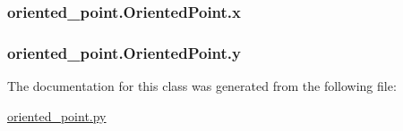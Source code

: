 \hypertarget{classoriented__point_1_1OrientedPoint_a020fc32ac0c377591b1d7686c66310ac}{
\subsubsection[{x}]{\setlength{\rightskip}{0pt plus 5cm}oriented\-\_\-point.\-Oriented\-Point.\-x}}\label{classoriented__point_1_1OrientedPoint_a020fc32ac0c377591b1d7686c66310ac}
\hypertarget{classoriented__point_1_1OrientedPoint_a9f9f32b6143828eefe2c768680b9ac44}{
\subsubsection[{y}]{\setlength{\rightskip}{0pt plus 5cm}oriented\-\_\-point.\-Oriented\-Point.\-y}}\label{classoriented__point_1_1OrientedPoint_a9f9f32b6143828eefe2c768680b9ac44}


The documentation for this class was generated from the following file\-:\begin{DoxyCompactItemize}
\item 
\hyperlink{oriented__point_8py}{oriented\-\_\-point.\-py}\end{DoxyCompactItemize}
